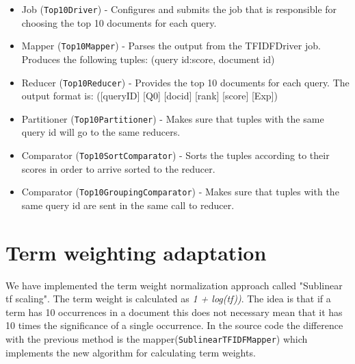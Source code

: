 \documentclass[a4paper, notitlepage]{article}
\begin{document}
\begin{itemize}
	\item Job (\lstinline{Top10Driver}) - Configures and submits the job that is responsible for choosing the top 10 documents for each query.
	\item Mapper (\lstinline{Top10Mapper}) - Parses the output from the TFIDFDriver job. Produces the following tuples: (query id:score, document id)
	\item Reducer (\lstinline{Top10Reducer}) - Provides the top 10 documents for each query. The output format is: ([queryID] [Q0] [docid] [rank] [score] [Exp])
  
	\item Partitioner (\lstinline{Top10Partitioner}) - Makes sure that tuples with the same query id will go to the same reducers.
	
	\item Comparator (\lstinline{Top10SortComparator}) - Sorts the tuples according to their scores in order to arrive sorted to the reducer.
	
	\item Comparator (\lstinline{Top10GroupingComparator}) - Makes sure that tuples with the same query id are sent in the same call to reducer.
	
\end{itemize}

%

\section{Term weighting adaptation}
We have implemented the term weight normalization approach called "Sublinear tf scaling". The term weight is calculated as \emph{1 + log(tf))}. The idea is that if a term has 10 occurrences in a document this does not necessary mean that it has 10 times the significance of a single occurrence. In the source code the difference with the previous method is the mapper(\lstinline{SublinearTFIDFMapper}) which implements the new algorithm for calculating term weights.
\end{document}
